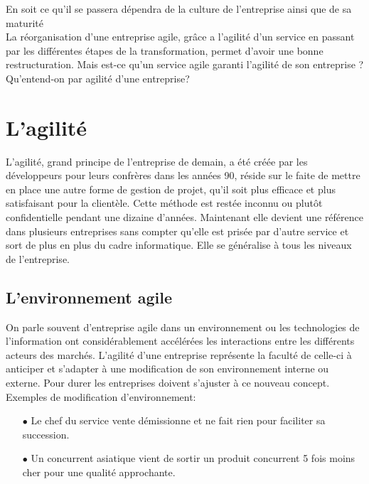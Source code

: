 \documentclass[12pt,a4paper]{article}
\begin{document}
En soit ce qu'il se passera dépendra de la culture de l'entreprise ainsi que de sa maturité\\

La réorganisation d'une entreprise agile, grâce a l'agilité d'un service en passant par les différentes étapes de la transformation, permet d'avoir une bonne restructuration. Mais est-ce qu’un service agile garanti l’agilité de son entreprise ? Qu’entend-on par agilité d’une entreprise?


\section{L'agilité}

L'agilité, grand principe de l’entreprise de demain, a été créée par les développeurs pour leurs confrères dans les années 90, réside sur le faite de mettre en place une autre forme de gestion de projet, qu'il soit plus efficace et plus satisfaisant pour la clientèle. Cette méthode est restée inconnu ou plutôt confidentielle pendant une dizaine d'années. Maintenant elle devient une référence dans plusieurs entreprises sans compter qu'elle est prisée par d'autre service et sort de plus en plus du cadre informatique. Elle se généralise à tous les niveaux de l'entreprise. 


\subsection{L'environnement agile}
On parle souvent d’entreprise agile dans un environnement ou les technologies de l’information ont considérablement accélérées les interactions entre les différents acteurs des marchés. L’agilité d’une entreprise représente la faculté de celle-ci à anticiper et s’adapter à une modification de son environnement interne ou externe. Pour durer les entreprises doivent s’ajuster à ce nouveau concept.
Exemples de modification d’environnement:

\begin{itemize}
\item[$\bullet$] Le chef du service vente démissionne et ne fait rien pour faciliter sa succession.

\item[$\bullet$] Un concurrent asiatique vient de sortir un produit concurrent 5 fois moins cher pour une qualité approchante.\\
\end{itemize}
\end{document}
